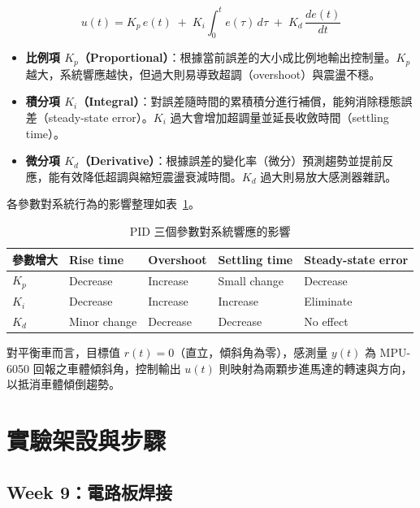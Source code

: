 \documentclass[12pt]{article}
\begin{document}
\begin{equation}
    u(t) = K_p \, e(t) \;+\; K_i \int_0^t e(\tau)\,d\tau \;+\; K_d \,\frac{de(t)}{dt}
\end{equation}

\begin{itemize}
    \item \textbf{比例項 $K_p$（Proportional）}：根據當前誤差的大小成比例地輸出控制量。$K_p$ 越大，系統響應越快，但過大則易導致超調（overshoot）與震盪不穩。
    \item \textbf{積分項 $K_i$（Integral）}：對誤差隨時間的累積積分進行補償，能夠消除穩態誤差（steady-state error）。$K_i$ 過大會增加超調量並延長收斂時間（settling time）。
    \item \textbf{微分項 $K_d$（Derivative）}：根據誤差的變化率（微分）預測趨勢並提前反應，能有效降低超調與縮短震盪衰減時間。$K_d$ 過大則易放大感測器雜訊。
\end{itemize}

各參數對系統行為的影響整理如表~\ref{tab:pid_effects}。

\begin{table}[H]
    \centering
    \begin{tabular}{lllll}
        \hline
        \textbf{參數增大} & \textbf{Rise time} & \textbf{Overshoot} & \textbf{Settling time} & \textbf{Steady-state error} \\
        \hline
        $K_p$ & Decrease & Increase & Small change & Decrease \\
        $K_i$ & Decrease & Increase & Increase     & Eliminate \\
        $K_d$ & Minor change & Decrease & Decrease  & No effect \\
        \hline
    \end{tabular}
    \caption{PID 三個參數對系統響應的影響}
    \label{tab:pid_effects}
\end{table}

對平衡車而言，目標值 $r(t) = 0$（直立，傾斜角為零），感測量 $y(t)$ 為 MPU-6050 回報之車體傾斜角，控制輸出 $u(t)$ 則映射為兩顆步進馬達的轉速與方向，以抵消車體傾倒趨勢。


\section{實驗架設與步驟}

\subsection{Week 9：電路板焊接}
\end{document}
